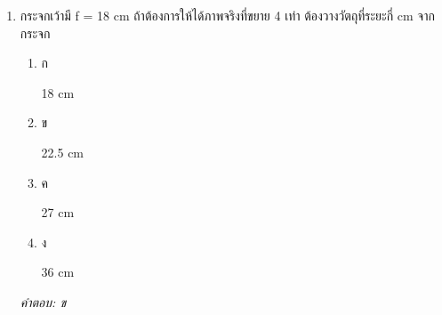 \documentclass[12pt]{article}
\begin{document}
\begin{enumerate}[label=\arabic*., itemsep=0.5\baselineskip, topsep=0.5\baselineskip, leftmargin=*]
\item กระจกเว้ามี f = 18 cm ถ้าต้องการให้ได้ภาพจริงที่ขยาย 4 เท่า ต้องวางวัตถุที่ระยะกี่ cm จากกระจก
\begin{enumerate}[label=\alph*)., itemsep=0.3\baselineskip, topsep=0.3\baselineskip]
\item ก\ 
\begin{minipage}[t]{0.9\linewidth}
\raggedright 18 cm
\end{minipage}
\item ข\ 
\begin{minipage}[t]{0.9\linewidth}
\raggedright 22.5 cm
\end{minipage}
\item ค\ 
\begin{minipage}[t]{0.9\linewidth}
\raggedright 27 cm
\end{minipage}
\item ง\ 
\begin{minipage}[t]{0.9\linewidth}
\raggedright 36 cm
\end{minipage}
\end{enumerate}
\vspace{-0.3\baselineskip}
\begin{small}
\textit{คำตอบ: ข}
\end{small}

\end{enumerate}
\end{document}
